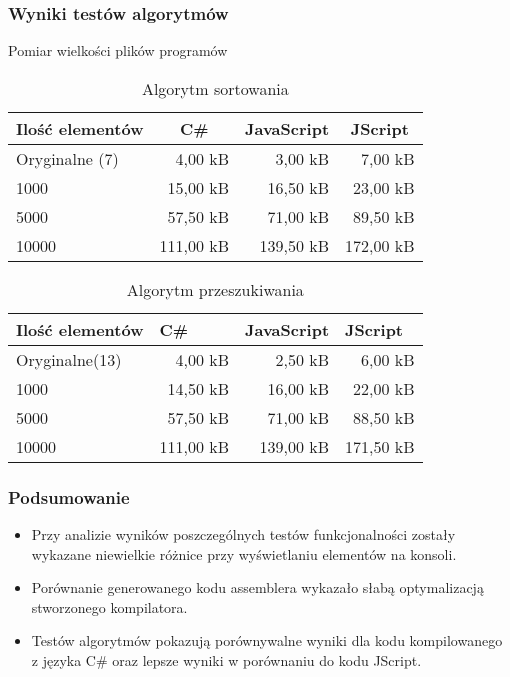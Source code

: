 \begin{frame}
  \frametitle{Wyniki testów algorytmów}
  \scriptsize
  \begin{block}{Pomiar wielkości plików programów}
    \begin{table}[h!]
      \centering
      \caption{Algorytm sortowania}
      \begin{tabular}{|l|r|r|r|}
      \hline
      \multicolumn{1}{|c|}{Ilość elementów} & \multicolumn{1}{|c|}{C\#} & \multicolumn{1}{|c|}{JavaScript}& \multicolumn{1}{|c|}{JScript} \\ \hline
      Oryginalne (7)  & 4,00 kB & 3,00 kB & 7,00 kB \\ \hline
      1000            & 15,00 kB & 16,50 kB & 23,00 kB \\ \hline
      5000            & 57,50 kB & 71,00 kB & 89,50 kB \\ \hline
      10000           & 111,00 kB & 139,50 kB & 172,00 kB \\ \hline
      \end{tabular}
    \end{table}
    \begin{table}[!h]
      \centering
      \caption{Algorytm przeszukiwania}
      \begin{tabular}{|l|r|r|r|}
      \hline
      Ilość elementów & \multicolumn{1}{l|}{C\#} & \multicolumn{1}{l|}{JavaScript} & \multicolumn{1}{l|}{JScript} \\ \hline
      Oryginalne(13)  & 4,00 kB    & 2,50 kB       & 6,00 kB    \\ \hline
      1000            & 14,50 kB   & 16,00 kB      & 22,00 kB   \\ \hline
      5000            & 57,50 kB   & 71,00 kB      & 88,50 kB   \\ \hline
      10000           & 111,00 kB  & 139,00 kB     & 171,50 kB  \\ \hline
      \end{tabular}
    \end{table}
  \end{block}
\end{frame}

\begin{frame}
  \frametitle{Podsumowanie}
  \begin{itemize}
    \item  Przy analizie wyników poszczególnych testów funkcjonalności zostały wykazane niewielkie różnice przy wyświetlaniu elementów na
    konsoli.
    \item Porównanie generowanego kodu assemblera wykazało słabą optymalizacją stworzonego kompilatora.
    \item Testów algorytmów pokazują porównywalne wyniki dla kodu kompilowanego z języka C\# oraz lepsze wyniki w porównaniu do kodu JScript.
  \end{itemize}
\end{frame}

